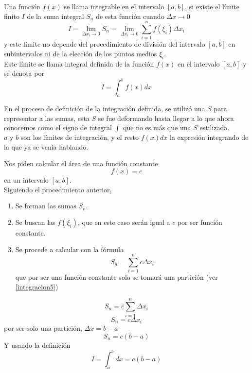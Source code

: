 \documentclass[10pt,twoside]{SelfArx} %
\begin{document}
 
   \begin{thm}
   	Una función $ f(x) $ se llama integrable en el intervalo $ [a,b] $, si existe el l\'imite finito $ I $ de la suma integral $ S_{n} $ de esta función cuando $ \Delta x\rightarrow0 $
   	\begin{equation}
   		I=\lim\limits_{\Delta x_{i}\rightarrow0}S_{n}=\lim\limits_{\Delta x_{i}\rightarrow0}\sum_{i=1}^{n}f(\xi_{i})\Delta x_{i}
   	\end{equation}
   	y este límite no depende del procedimiento de división del intervalo $ [a,b] $ en subintervalos ni de la elección de los puntos medios $ \xi_{i} $.\\
   	Este límite se llama integral definida de la función $ f(x) $ en el intervalo $ [a,b] $ y se denota por
   	\begin{equation}
   		 I=\int_{a}^{b}f(x)dx 
   	\end{equation}
   \end{thm}
En el proceso de definición de la integración definida, se utilizó una $ S $   para representar a las sumas, esta $ S $ se fue deformando hasta llegar a lo que ahora conocemos como el signo de integral $ \int $ que no es más que una $ S $ estilizada.\\
$ a $ y $ b $ son los límites de integración, y el resto $ f(x)dx $ la expresión integrando de la que ya se venía hablando.
 \begin{ejemplo}
 	Nos piden calcular el área de una función constante
 	\[ f(x)=c \]
 	en un intervalo $ [a,b] $.\\
 	Siguiendo el procedimiento anterior, 
 	\begin{enumerate}
 		\item Se forman las sumas $ S_{n} $.
 		\item Se buscan las $ f(\xi_{i}) $, que en este caso serán igual a $ c $ por ser función constante.
 		\item Se procede a calcular con la fórmula
 		\[ S_{n}=\sum_{i=1}^{n}c\Delta x_{i} \]
 		que por ser una funci\'on constante solo se tomará una partición (ver \ref{integracion5})
 	\end{enumerate}
 	\begin{equation}
 	S_{n}=c\sum_{i=1}^{n}\Delta x_{i}
 	\end{equation}
 	\begin{equation}
 	S_{n}=c\Delta x_{i}
 	\end{equation}
 	por ser solo una partición, $ \Delta x=b-a $
 	\begin{equation}
 	S_{n}=c(b-a)
 	\end{equation}
 	Y usando la definición
 	\[ I=\int_{a}^{b}dx=c(b-a) \]
 \end{ejemplo}
 
\end{document}
